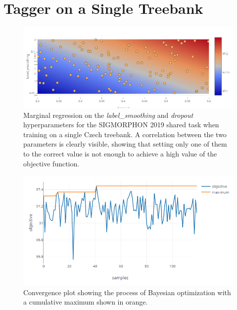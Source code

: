 \section{Tagger on a Single Treebank}
\label{section:exp-cestina}

\begin{figure}
	\begin{center}
		\includegraphics[width=1.0\textwidth]{images/czech-2d-marginal.png}
		\caption{Marginal regression on the \emph{label\_smoothing} and \emph{dropout} hyperparameters for the SIGMORPHON 2019 shared task when training on a single Czech treebank. A correlation between the two parameters is clearly visible, showing that setting only one of them to the correct value is not enough to achieve a high value of the objective function.}
		\label{figure:czech-2d-marginal}
	\end{center}
\end{figure}

\begin{figure}
	\begin{center}
		\includegraphics[width=1.0\textwidth]{images/czech-convergence.png}
		\caption{Convergence plot showing the process of Bayesian optimization with a cumulative maximum shown in orange.}
		\label{figure:czech-convergence}
	\end{center}
\end{figure}

